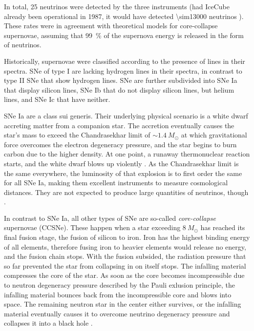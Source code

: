 \documentclass[
    a4paper, %
    fontsize=10pt, %
    twoside=false, %
    numbers=noenddot, %
    fontmethod=tex,
]{kaobook}
\begin{document}
In total, 25 neutrinos were detected by the three instruments (had IceCube already been operational in 1987, it would have detected \num{\sim13000} neutrinos ). These rates were in agreement with theoretical models for core-collapse supernovae, assuming that \SI{99}{\percent} of the supernova energy is released in the form of neutrinos.

Historically, supernovae were classified according to the presence of lines in their spectra. SNe of type I are lacking hydrogen lines in their spectra, in contrast to type II SNe that show hydrogen lines. SNe are further subdivided into SNe Ia that display silicon lines, SNe Ib that do not display silicon lines, but helium lines, and SNe Ic that have neither.

SNe Ia are a class sui generis. Their underlying physical scenario is a white dwarf accreting matter from a companion star. The accretion eventually causes the star's mass to exceed the Chandrasekhar limit of $\sim 1.4~M_\odot$ at which gravitational force overcomes the electron degeneracy pressure, and the star begins to burn carbon due to the higher density. At one point, a runaway thermonuclear reaction starts, and the white dwarf blows up violently . As the Chandrasekhar limit is the same everywhere, the luminosity of that explosion is to first order the same for all SNe Ia, making them excellent instruments to measure cosmological distances. They are not expected to produce large quantities of neutrinos, though .

In contrast to SNe Ia, all other types of SNe are so-called \textit{core-collapse} supernovae (CCSNe). These happen when a star exceeding $8~M_\odot$ has reached its final fusion stage, the fusion of silicon to iron. Iron has the highest binding energy of all elements, therefore fusing iron to heavier elements would release no energy, and the fusion chain stops. With the fusion subsided, the radiation pressure that so far prevented the star from collapsing in on itself stops. The infalling material compresses the core of the star. As soon as the core becomes incompressible due to neutron degeneracy pressure described by the Pauli exlusion principle, the infalling material bounces back from the incompressible core and blows into space. The remaining neutron star in the center either survives, or the infalling material eventually causes it to overcome neutrino degeneracy pressure and collapses it into a black hole \cite{Alsabti2017}.
\end{document}
